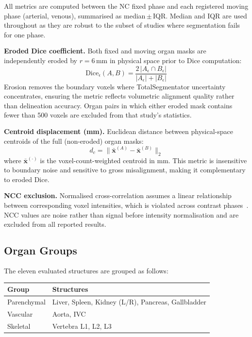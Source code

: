 \documentclass[10pt,twocolumn]{article}
\begin{document}
All metrics are computed between the NC fixed phase and each registered
moving phase (arterial, venous), summarised as median\,$\pm$\,IQR.
Median and IQR are used throughout as they are robust to the subset
of studies where segmentation fails for one phase.

\textbf{Eroded Dice coefficient.}
Both fixed and moving organ masks are independently eroded by
$r = 6$\,mm in physical space prior to Dice computation:
%
\begin{equation}
  \text{Dice}_\epsilon(A,B) =
  \frac{2\,|A_\epsilon \cap B_\epsilon|}{|A_\epsilon| + |B_\epsilon|}
  \label{eq:dice}
\end{equation}
%
Erosion removes the boundary voxels where TotalSegmentator uncertainty
concentrates, ensuring the metric reflects volumetric alignment quality
rather than delineation accuracy.
Organ pairs in which either eroded mask contains fewer than 500 voxels
are excluded from that study's statistics.

\textbf{Centroid displacement (mm).}
Euclidean distance between physical-space centroids of the full
(non-eroded) organ masks:
%
\begin{equation}
  d_c = \bigl\|\bar{\mathbf{x}}^{(A)} - \bar{\mathbf{x}}^{(B)}\bigr\|_2
  \label{eq:centroid}
\end{equation}
%
where $\bar{\mathbf{x}}^{(\cdot)}$ is the voxel-count-weighted centroid
in mm.
This metric is insensitive to boundary noise and sensitive to gross
misalignment, making it complementary to eroded Dice.

\textbf{NCC exclusion.}
Normalised cross-correlation assumes a linear relationship between
corresponding voxel intensities, which is violated across contrast
phases~\cite{pluim2003}.
NCC values are noise rather than signal before intensity normalisation
and are excluded from all reported results.

\subsection{Organ Groups}

The eleven evaluated structures are grouped as follows:

\begin{center}
\small
\begin{tabular}{ll}
\toprule
\textbf{Group} & \textbf{Structures} \\
\midrule
Parenchymal & Liver, Spleen, Kidney (L/R), Pancreas, Gallbladder \\
Vascular    & Aorta, IVC \\
Skeletal    & Vertebra L1, L2, L3 \\
\bottomrule
\end{tabular}
\end{center}
\end{document}
